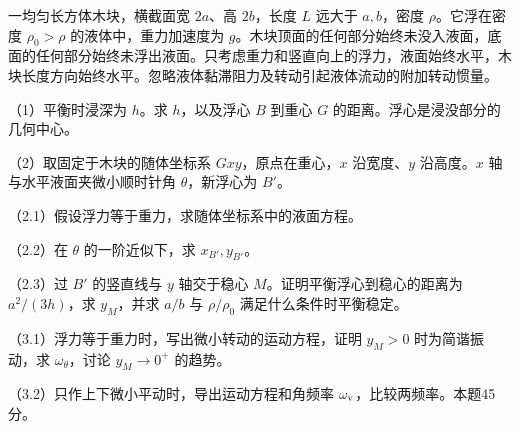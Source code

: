 \documentclass[12pt,a4paper,fontset=fandol]{ctexart}
\begin{document}
一均匀长方体木块，横截面宽 \(2a\)、高 \(2b\)，长度 \(L\) 远大于
\(a,b\)，密度 \(\rho\)。它浮在密度 \(\rho_0>\rho\)
的液体中，重力加速度为
\(g\)。木块顶面的任何部分始终未没入液面，底面的任何部分始终未浮出液面。只考虑重力和竖直向上的浮力，液面始终水平，木块长度方向始终水平。忽略液体黏滞阻力及转动引起液体流动的附加转动惯量。

（1）平衡时浸深为 \(h\)。求 \(h\)，以及浮心 \(B\) 到重心 \(G\)
的距离。浮心是浸没部分的几何中心。

（2）取固定于木块的随体坐标系 \(Gxy\)，原点在重心，\(x\) 沿宽度、\(y\)
沿高度。\(x\) 轴与水平液面夹微小顺时针角 \(\theta\)，新浮心为 \(B'\)。

（2.1）假设浮力等于重力，求随体坐标系中的液面方程。

（2.2）在 \(\theta\) 的一阶近似下，求 \(x_{B'},y_{B'}\)。

（2.3）过 \(B'\) 的竖直线与 \(y\) 轴交于稳心
\(M\)。证明平衡浮心到稳心的距离为 \(a^2/(3h)\)，求 \(y_M\)，并求 \(a/b\)
与 \(\rho/\rho_0\) 满足什么条件时平衡稳定。

（3.1）浮力等于重力时，写出微小转动的运动方程，证明 \(y_M>0\)
时为简谐振动，求 \(\omega_\theta\)，讨论 \(y_M\to0^+\) 的趋势。

（3.2）只作上下微小平动时，导出运动方程和角频率
\(\omega_{\rm v}\)，比较两频率。本题45分。

\begin{center}
\begin{minipage}{\linewidth}
\centering\begingroup
{}
\ifdim\wd\diagrambox>.88\linewidth
\sbox{\diagrambox}{\resizebox{.88\linewidth}{!}{\usebox{\diagrambox}}}
\fi
\ifdim\ht\diagrambox>.29\textheight
\resizebox{!}{.29\textheight}{\usebox{\diagrambox}}
\else\usebox{\diagrambox}\fi
\par{}
\endgroup\end{minipage}
\end{center}
\end{document}
